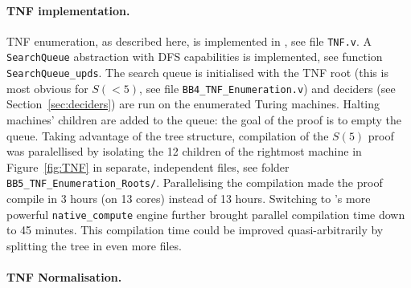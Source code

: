 \paragraph{\CoqBB TNF implementation.} TNF enumeration, as described here, is implemented in \CoqBB, see file \texttt{TNF.v}. A \texttt{SearchQueue} abstraction with DFS capabilities is implemented, see function \texttt{SearchQueue\_upds}. The search queue is initialised with the TNF root (this is most obvious for $S(<5)$, \eg see file \texttt{BB4\_TNF\_Enumeration.v}) and deciders (see Section~\ref{sec:deciders}) are run on the enumerated Turing machines. Halting machines' children are added to the queue: the goal of the proof is to empty the queue. Taking advantage of the tree structure, compilation of the $S(5)$ proof was paralellised by isolating the 12 children of the rightmost machine in Figure~\ref{fig:TNF} in separate, independent files, see folder \texttt{BB5\_TNF\_Enumeration\_Roots/}. Parallelising the compilation made the proof compile in 3 hours (on 13 cores) instead of 13 hours. Switching to \Coq's more powerful \texttt{native\_compute} engine \cite{nativecompute} further brought parallel compilation time down to 45 minutes. This compilation time could be improved quasi-arbitrarily by splitting the tree in even more files.



\paragraph{TNF Normalisation.} %